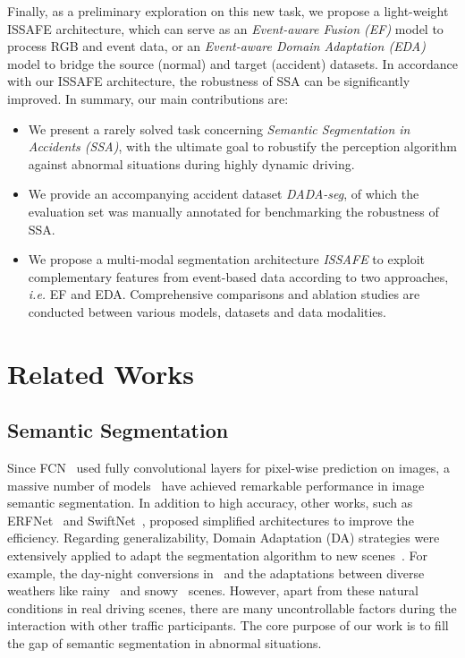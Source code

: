 \documentclass[letterpaper, 10 pt, conference]{ieeeconf}
\begin{document}
Finally, as a preliminary exploration on this new task, we propose a light-weight ISSAFE architecture, which can serve as an \textit{Event-aware Fusion (EF)} model to process RGB and event data, or an \textit{Event-aware Domain Adaptation (EDA)} model to bridge the source (normal) and target (accident) datasets. 
In accordance with our ISSAFE architecture, the robustness of SSA can be significantly improved. In summary, our main contributions are:
\begin{itemize}

    \item We present a rarely solved task concerning \textit{Semantic Segmentation in Accidents (SSA)}, with the ultimate goal to robustify the perception algorithm against abnormal situations during highly dynamic driving.
    \item We provide an accompanying accident dataset \textit{DADA-seg}, of which the evaluation set was manually annotated for benchmarking the robustness of SSA.
    \item We propose a multi-modal segmentation architecture \textit{ISSAFE} to exploit complementary features from event-based data according to two approaches, \textit{i.e.} EF and EDA. Comprehensive comparisons and ablation studies are conducted between various models, datasets and data modalities.
\end{itemize}

\section{Related Works}
\subsection{Semantic Segmentation}
Since FCN~\cite{long2015FCN} used fully convolutional layers for pixel-wise prediction on images, a massive number of models~\cite{zhao2017PSPNet, chen2018deeplabv3plus, yuan2019OCRNet} have achieved remarkable performance in image semantic segmentation. In addition to high accuracy, other works, such as ERFNet~\cite{romera2017erfnet} and SwiftNet~\cite{orsic2019swiftnet}, proposed simplified architectures to improve the efficiency. Regarding generalizability, Domain Adaptation (DA) strategies were extensively applied to adapt the segmentation algorithm to new scenes~\cite{luo2019CLAN}. For example, the day-night conversions in~\cite{sun2019seeclear} and the adaptations between diverse weathers like rainy~\cite{pizzati2020i2i_UDA} and snowy~\cite{liu2019SS_snowy_DA} scenes. However, apart from these natural conditions in real driving scenes, there are many uncontrollable factors during the interaction with other traffic participants. The core purpose of our work is to fill the gap of semantic segmentation in abnormal situations.
\end{document}
